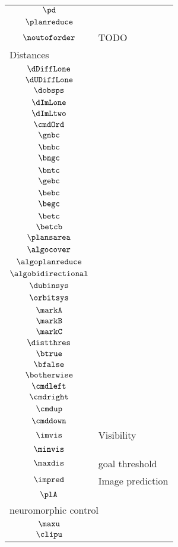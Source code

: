 \begin{longtable}{cl}
 $\pd$ & \\ 
 $\planreduce$ & \\ 
 $\noutoforder$ &  TODO\\ 
 \multicolumn{2}{l}{Distances}\\ 
 \hline
$\dDiffLone$ & \\ 
 $\dUDiffLone$ & \\ 
 $\dobsps$ & \\ 
 $\dImLone$ & \\ 
 $\dImLtwo$ & \\ 
 $\cmdOrd$ & \\ 
 $\gnbc$ & \\ 
 $\bnbc$ & \\ 
 $\bngc$ & \\ 
 $\bntc$ & \\ 
 $\gebc$ & \\ 
 $\bebc$ & \\ 
 $\begc$ & \\ 
 $\betc$ & \\ 
 $\betcb$ & \\ 
 $\plansarea$ & \\ 
 $\algocover$ & \\ 
 $\algoplanreduce$ & \\ 
 $\algobidirectional$ & \\ 
 $\dubinsys$ & \\ 
 $\orbitsys$ & \\ 
 $\markA$ & \\ 
 $\markB$ & \\ 
 $\markC$ & \\ 
 $\distthres$ & \\ 
 $\btrue$ & \\ 
 $\bfalse$ & \\ 
 $\botherwise$ & \\ 
 $\cmdleft$ & \\ 
 $\cmdright$ & \\ 
 $\cmdup$ & \\ 
 $\cmddown$ & \\ 
 $\imvis$ &  Visibility\\ 
 $\minvis$ & \\ 
 $\maxdis$ &  goal threshold\\ 
 $\impred$ &  Image prediction\\ 
 $\plA$ & \\ 
 \multicolumn{2}{l}{neuromorphic control}\\ 
 \hline
$\maxu$ & \\ 
 $\clipu$ & \\ 

\end{longtable}
